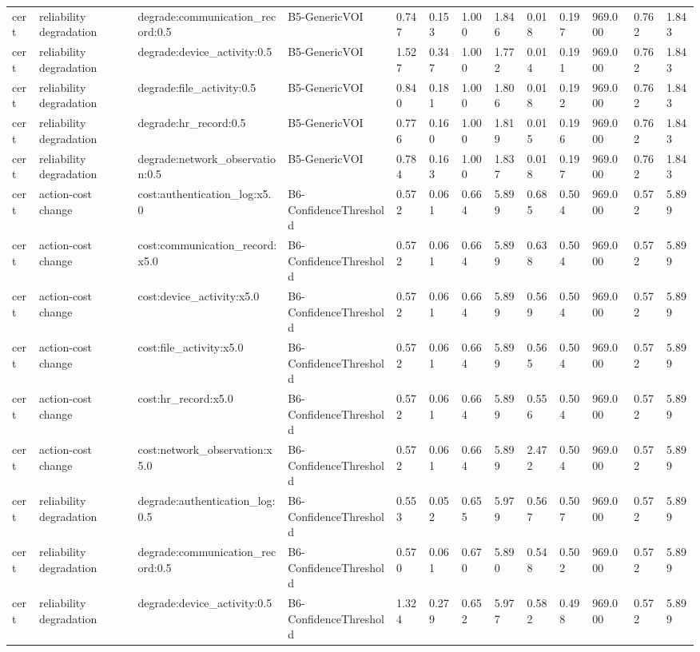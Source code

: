 \begin{table}[!ht]
{\begin{tabular}{lllllllllllll}
cert & reliability degradation & degrade:communication\_record:0.5 & B5-GenericVOI & 0.747 & 0.153 & 1.000 & 1.846 & 0.018 & 0.197 & 969.000 & 0.762 & 1.843 \\
cert & reliability degradation & degrade:device\_activity:0.5 & B5-GenericVOI & 1.527 & 0.347 & 1.000 & 1.772 & 0.014 & 0.191 & 969.000 & 0.762 & 1.843 \\
cert & reliability degradation & degrade:file\_activity:0.5 & B5-GenericVOI & 0.840 & 0.181 & 1.000 & 1.806 & 0.018 & 0.192 & 969.000 & 0.762 & 1.843 \\
cert & reliability degradation & degrade:hr\_record:0.5 & B5-GenericVOI & 0.776 & 0.160 & 1.000 & 1.819 & 0.015 & 0.196 & 969.000 & 0.762 & 1.843 \\
cert & reliability degradation & degrade:network\_observation:0.5 & B5-GenericVOI & 0.784 & 0.163 & 1.000 & 1.837 & 0.018 & 0.197 & 969.000 & 0.762 & 1.843 \\
cert & action-cost change & cost:authentication\_log:x5.0 & B6-ConfidenceThreshold & 0.572 & 0.061 & 0.664 & 5.899 & 0.685 & 0.504 & 969.000 & 0.572 & 5.899 \\
cert & action-cost change & cost:communication\_record:x5.0 & B6-ConfidenceThreshold & 0.572 & 0.061 & 0.664 & 5.899 & 0.638 & 0.504 & 969.000 & 0.572 & 5.899 \\
cert & action-cost change & cost:device\_activity:x5.0 & B6-ConfidenceThreshold & 0.572 & 0.061 & 0.664 & 5.899 & 0.569 & 0.504 & 969.000 & 0.572 & 5.899 \\
cert & action-cost change & cost:file\_activity:x5.0 & B6-ConfidenceThreshold & 0.572 & 0.061 & 0.664 & 5.899 & 0.565 & 0.504 & 969.000 & 0.572 & 5.899 \\
cert & action-cost change & cost:hr\_record:x5.0 & B6-ConfidenceThreshold & 0.572 & 0.061 & 0.664 & 5.899 & 0.556 & 0.504 & 969.000 & 0.572 & 5.899 \\
cert & action-cost change & cost:network\_observation:x5.0 & B6-ConfidenceThreshold & 0.572 & 0.061 & 0.664 & 5.899 & 2.472 & 0.504 & 969.000 & 0.572 & 5.899 \\
cert & reliability degradation & degrade:authentication\_log:0.5 & B6-ConfidenceThreshold & 0.553 & 0.052 & 0.655 & 5.979 & 0.567 & 0.507 & 969.000 & 0.572 & 5.899 \\
cert & reliability degradation & degrade:communication\_record:0.5 & B6-ConfidenceThreshold & 0.570 & 0.061 & 0.670 & 5.890 & 0.548 & 0.502 & 969.000 & 0.572 & 5.899 \\
cert & reliability degradation & degrade:device\_activity:0.5 & B6-ConfidenceThreshold & 1.324 & 0.279 & 0.652 & 5.977 & 0.582 & 0.498 & 969.000 & 0.572 & 5.899 \\

\end{tabular}}
\end{table}
